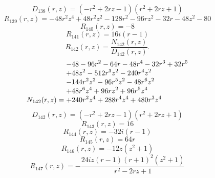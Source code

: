 \documentclass[11pt,a4paper]{article}
\begin{document}
\begin{equation}
D_{138}(r,z)=\left(- r^{2} + 2 r z - 1\right) \left(r^{2} + 2 r z + 1\right)
\label{eq:cat-denominator-138}
\end{equation}
\begin{equation}
R_{139}(r,z)=- 48 r^{2} z^{4} + 48 r^{2} z^{2} - 128 r^{2} - 96 r z^{2} - 32 r - 48 z^{2} - 80
\label{eq:cat-rational-139}
\end{equation}
\begin{equation}
R_{140}(r,z)=-8
\label{eq:cat-rational-140}
\end{equation}
\begin{equation}
R_{141}(r,z)=16 i \left(r - 1\right)
\label{eq:cat-rational-141}
\end{equation}
\begin{equation}
R_{142}(r,z)=\frac{N_{142}(r,z)}{D_{142}(r,z)}.
\label{eq:cat-rational-142}
\end{equation}
\begin{equation}
N_{142}(r,z)=\shortstack[l]{$\displaystyle  - 48 - 96 r^{2} - 64 r - 48 r^{4} - 32 r^{3} + 32 r^{5}$\\
$\displaystyle  + 48 z^{2} - 512 r^{3} z^{2} - 240 r^{4} z^{2}$\\
$\displaystyle  - 144 r^{2} z^{2} - 96 r^{5} z^{2} - 48 r^{6} z^{2}$\\
$\displaystyle  + 48 r^{6} z^{4} + 96 r z^{2} + 96 r^{5} z^{4}$\\
$\displaystyle  + 240 r^{2} z^{4} + 288 r^{4} z^{4} + 480 r^{3} z^{4}$}
\label{eq:cat-numerator-142}
\end{equation}
\begin{equation}
D_{142}(r,z)=\left(- r^{2} + 2 r z - 1\right) \left(r^{2} + 2 r z + 1\right)
\label{eq:cat-denominator-142}
\end{equation}
\begin{equation}
R_{143}(r,z)=16
\label{eq:cat-rational-143}
\end{equation}
\begin{equation}
R_{144}(r,z)=- 32 i \left(r - 1\right)
\label{eq:cat-rational-144}
\end{equation}
\begin{equation}
R_{145}(r,z)=64 r
\label{eq:cat-rational-145}
\end{equation}
\begin{equation}
R_{146}(r,z)=- 12 z \left(z^{2} + 1\right)
\label{eq:cat-rational-146}
\end{equation}
\begin{equation}
R_{147}(r,z)=- \frac{24 i z \left(r - 1\right) \left(r + 1\right)^{2} \left(z^{2} + 1\right)}{r^{2} - 2 r z + 1}
\label{eq:cat-rational-147}
\end{equation}
\end{document}
